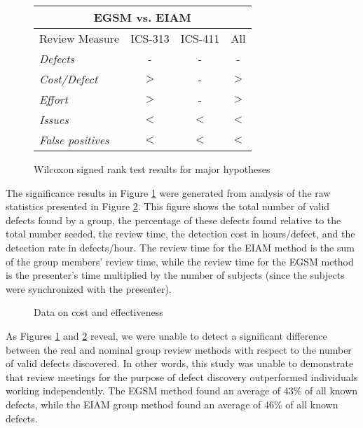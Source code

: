 \begin{figure}[ht]
  \small
  \begin{center}
  \begin{tabular}{|l|c|c|c|}
  \multicolumn{4}{c}{EGSM vs. EIAM}\\
   \hline
Review Measure    & ICS-313 & ICS-411 & All \\
   \hline
{\em Defects}         & -       & -       & - \\
{\em Cost/Defect}     & $>$     & -       & $>$ \\  
{\em Effort}          & $>$     & -       & $>$ \\
{\em Issues}          & $<$     & $<$     & $<$ \\
{\em False positives} & $<$     & $<$     & $<$ \\
  \hline
   \end{tabular}
  \end{center}
 \caption{Wilcoxon signed rank test results for major hypotheses}
 \label{fig:wilcoxon-results}
\normalsize
\end{figure}

The significance results in Figure \ref{fig:wilcoxon-results} were generated
from analysis of the raw statistics presented in 
Figure \ref{fig:main-hypothesis}.  This figure shows
the total number of valid defects found by a group, the percentage of these
defects found relative to the total number seeded, the
review time, the detection cost in hours/defect, and
the detection rate in defects/hour.  The review time for the EIAM
method is the sum of the group members' review time, while the review time
for the EGSM method is the presenter's time multiplied by the number of
subjects (since the subjects were synchronized with the presenter).

\begin{figure}[htpb]
 {\centerline{}}
 \caption{Data on cost and effectiveness}
 \label{fig:main-hypothesis}
\end{figure}


As Figures \ref{fig:wilcoxon-results} and \ref{fig:main-hypothesis} reveal,
we were unable to detect a significant difference between the real and
nominal group review methods with respect to the number of valid defects
discovered. In other words, this study was unable to demonstrate that
review meetings for the purpose of defect discovery outperformed
individuals working independently.  The EGSM method found an average
of 43\% of all known defects, while the EIAM group method found an
average of 46\% of all known defects.

